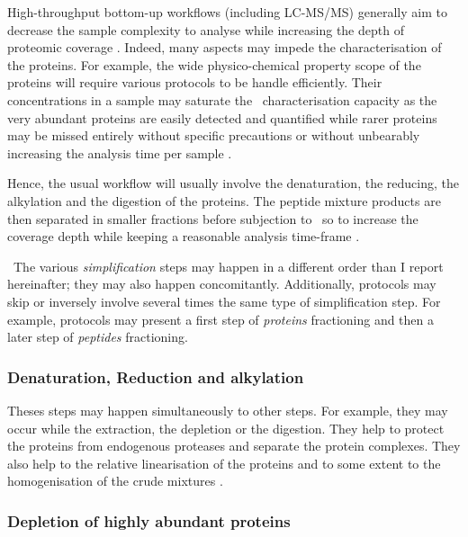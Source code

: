 High-throughput bottom-up workflows (including \gls{LC-MS/MS}) generally
aim to decrease the sample complexity to analyse while increasing the depth
of proteomic coverage . Indeed,
many aspects may impede the characterisation of the proteins.
For example, the wide physico-chemical property scope of the proteins will
require various protocols to be handle efficiently.
Their concentrations in a sample may saturate the \ms\ characterisation capacity
as the very abundant proteins are easily detected and quantified while rarer
proteins may be missed entirely without specific precautions
 or without unbearably increasing the
analysis time per sample .

Hence, the usual workflow will usually involve the denaturation, the reducing,
the alkylation and the digestion of the proteins. The peptide mixture products
are then separated in smaller fractions before subjection to \ms\ so to increase
the coverage depth while keeping a reasonable analysis time-frame
.

\NB\ The various \emph{simplification} steps may happen in a different order
than I report hereinafter; they may also happen concomitantly. Additionally,
protocols may skip or inversely involve several times the same type of
simplification step. For example, protocols may present a first step of
\emph{proteins} fractioning and then a later step of \emph{peptides} fractioning.

\subsubsection{Denaturation, Reduction and alkylation}

Theses steps may happen simultaneously to other steps. For example, they may
occur while the extraction, the depletion or the digestion. They help to protect
the proteins from endogenous proteases and separate the protein complexes. They
also help to the relative linearisation of the proteins and to some extent to
the homogenisation of the crude mixtures .

\subsubsection{Depletion of highly abundant proteins}

